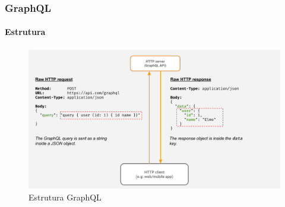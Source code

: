 \documentclass[
	9pt, %
	t, %
]{beamer}
\begin{document}
\begin{frame}
	\frametitle{GraphQL}
	\framesubtitle{Estrutura}

	\begin{figure}
		\includegraphics[width=0.9\linewidth]{graphql.png}
		\caption{Estrutura GraphQL}
		\label{fig:graphql_structure}
	\end{figure}

\end{frame}
\end{document}
